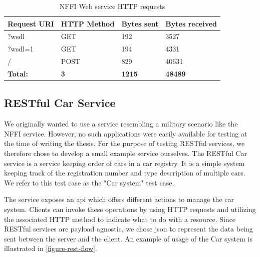 \begin{table}[h]
\begin{tabular}{|l|l|l|l|}
\hline
\textbf{Request URI} & \textbf{HTTP Method} & \textbf{Bytes sent} & \textbf{Bytes received} \\ \hline
?wsdl                & GET                  & 192                 & 3527           \\ \hline
?wsdl=1              & GET                  & 194                 & 4331           \\ \hline
/                    & POST                 & 829                 & 40631          \\ \hline
\textbf{Total:}       & \textbf{3}                     & \textbf{1215}                & \textbf{48489}          \\ \hline
\end{tabular}
\caption{NFFI Web service HTTP requests}
\end{table}


\subsection{RESTful Car Service}

We originally wanted to use a service resembling a military scenario like the
NFFI service. However, no such applications were easily available for testing at
the time of writing the thesis. For the purpose of testing RESTful services, we
therefore chose to develop a small example service ourselves. The RESTful Car
service is a service keeping order of cars in a car registry. It is a
simple system keeping track of the registration number and type description of
multiple cars. We refer to this test case as the "Car system" test case.

 The service exposes an \gls{api} which offers different actions to manage the
 car system. Clients can invoke these operations by using HTTP requests and
 utilizing the associated HTTP method to indicate what to do with a resource.
 Since RESTful services are payload agnostic, we chose \gls{json} to represent
 the data being sent between the server and the client. An example of usage of
 the Car system is illustrated in \cref{figure-rest-flow}.

